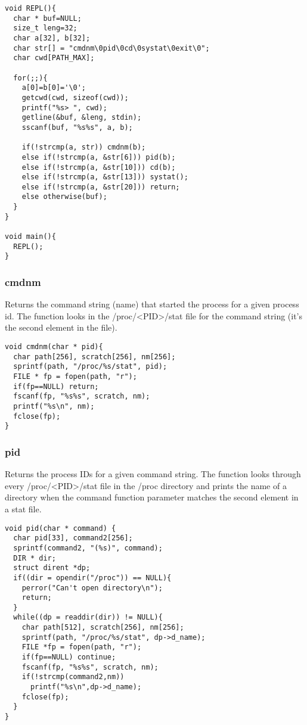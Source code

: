 \documentclass[12pt]{article}
\begin{document}
\newpage
\begin{verbatim}
void REPL(){
  char * buf=NULL;
  size_t leng=32;
  char a[32], b[32];
  char str[] = "cmdnm\0pid\0cd\0systat\0exit\0";
  char cwd[PATH_MAX];

  for(;;){
    a[0]=b[0]='\0';
    getcwd(cwd, sizeof(cwd));  
    printf("%s> ", cwd);
    getline(&buf, &leng, stdin);
    sscanf(buf, "%s%s", a, b);

    if(!strcmp(a, str)) cmdnm(b);	
    else if(!strcmp(a, &str[6])) pid(b);
    else if(!strcmp(a, &str[10])) cd(b);
    else if(!strcmp(a, &str[13])) systat();
    else if(!strcmp(a, &str[20])) return;
    else otherwise(buf); 
  }
}

void main(){ 
  REPL(); 
}
\end{verbatim}

\noindent \subsubsection*{cmdnm} \par
Returns the command string (name) that started the process for a given process id. The function looks in the {\ttfamily /proc/<PID>/stat } file for the command string (it's the second element in the file). 
\begin{verbatim}
void cmdnm(char * pid){
  char path[256], scratch[256], nm[256];
  sprintf(path, "/proc/%s/stat", pid);
  FILE * fp = fopen(path, "r");	
  if(fp==NULL) return;
  fscanf(fp, "%s%s", scratch, nm);
  printf("%s\n", nm);
  fclose(fp);
}
\end{verbatim}

\newpage
\noindent \subsubsection*{pid} \par
Returns the process IDs for a given command string. The function looks through every {\ttfamily /proc/<PID>/stat} file in the {\ttfamily /proc} directory and prints the name of a directory when the {\ttfamily command} function parameter matches the second element in a {\ttfamily stat} file.
\begin{verbatim}
void pid(char * command) {
  char pid[33], command2[256];
  sprintf(command2, "(%s)", command);
  DIR * dir;
  struct dirent *dp;
  if((dir = opendir("/proc")) == NULL){
    perror("Can't open directory\n");
    return;
  }
  while((dp = readdir(dir)) != NULL){
    char path[512], scratch[256], nm[256];
    sprintf(path, "/proc/%s/stat", dp->d_name);
    FILE *fp = fopen(path, "r");	
    if(fp==NULL) continue;
    fscanf(fp, "%s%s", scratch, nm);
    if(!strcmp(command2,nm))
      printf("%s\n",dp->d_name);
    fclose(fp);
  }
}
\end{verbatim}
\end{document}
